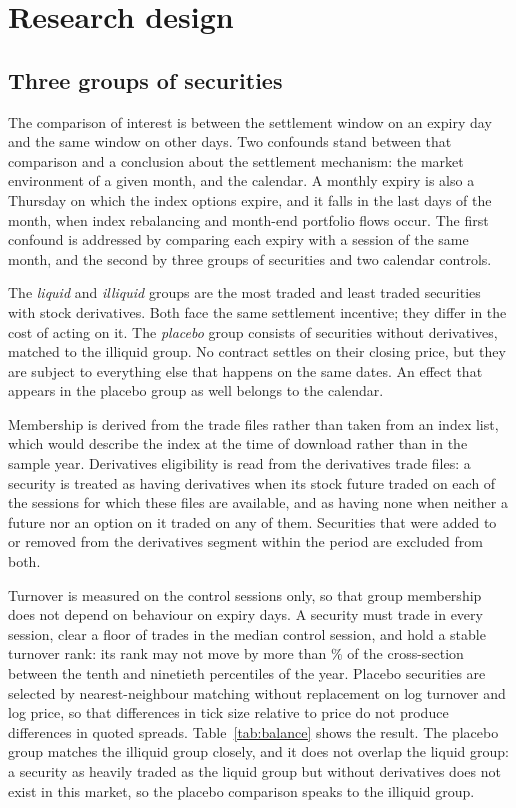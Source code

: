 \section{Research design}\label{sec:design}

\subsection{Three groups of securities}

The comparison of interest is between the settlement window on an expiry day and the same
window on other days. Two confounds stand between that comparison and a conclusion about
the settlement mechanism: the market environment of a given month, and the calendar. A
monthly expiry is also a Thursday on which the index options expire, and it falls in the last
days of the month, when index rebalancing and month-end portfolio flows occur. The first
confound is addressed by comparing each expiry with a session of the same month, and the second
by three groups of securities and two calendar controls.

The \emph{liquid} and \emph{illiquid} groups are the \SelectGroupSize{} most traded and
\SelectGroupSize{} least traded securities with stock derivatives. Both face the same
settlement incentive; they differ in the cost of acting on it. The \emph{placebo} group
consists of \SelectGroupSize{} securities without derivatives, matched to the illiquid group.
No contract settles on their closing price, but they are subject to everything else that
happens on the same dates. An effect that appears in the placebo group as well belongs to the
calendar.

Membership is derived from the trade files rather than taken from an index list, which would
describe the index at the time of download rather than in the sample year. Derivatives
eligibility is read from the derivatives trade files: a security is treated as having
derivatives when its stock future traded on each of the \ConvSessions{} sessions for which
these files are available, and as having none when neither a future nor an option on it
traded on any of them. Securities that were added to or removed from the derivatives segment
within the period are excluded from both.

Turnover is measured on the \SelectControlSessions{} control sessions only, so that group
membership does not depend on behaviour on expiry days. A security must trade in every
session, clear a floor of \SelectMinTrades{} trades in the median control session, and hold a
stable turnover rank: its rank may not move by more than \SelectMaxRankSpan{}\% of the
cross-section between the tenth and ninetieth percentiles of the year. Placebo securities are
selected by nearest-neighbour matching without replacement on log turnover and log price, so
that differences in tick size relative to price do not produce differences in quoted spreads.
Table~\ref{tab:balance} shows the result. The placebo group matches the illiquid group
closely, and it does not overlap the liquid group: a security as heavily traded as the liquid
group but without derivatives does not exist in this market, so the placebo comparison speaks
to the illiquid group.

